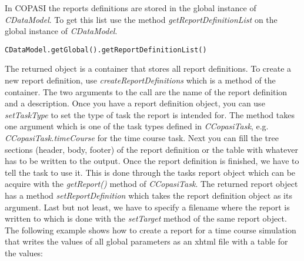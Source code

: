 \documentclass[a4,10pt]{article}
\begin{document}
In COPASI the reports definitions are stored in the global instance of \textit{CDataModel}. To get this list use the method \textit{getReportDefinitionList} on the global instance of \textit{CDataModel}.

\begin{verbatim}
CDataModel.getGlobal().getReportDefinitionList()
\end{verbatim}

The returned object is a container that stores all report definitions. To create a new report definition, use \textit{createReportDefinitions} which is a method of the container. The two arguments to the call are the name of the report definition and a description. Once you have a report definition object, you can use \textit{setTaskType} to set the type of task the report is intended for. The method takes one argument which is one of the task types defined in \textit{CCopasiTask}, e.g. \textit{CCopasiTask.timeCourse} for the time course task.
Next you can fill the tree sections (header, body, footer) of the report definition or the table  with whatever has to be written to the output.
Once the report definition is finished, we have to tell the task to use it. This is done through the tasks report object which can be acquire with the \textit{getReport()} method of \textit{CCopasiTask}. The returned report object has a method \textit{setReportDefinition} which takes the report definition object as its argument.
Last but not least, we have to specify a filename where the report is written to which is done with the \textit{setTarget} method of the same report object.
The following example shows how to create a report for a time course simulation that writes the values of all global parameters as an xhtml file with a table for the values:
\end{document}
